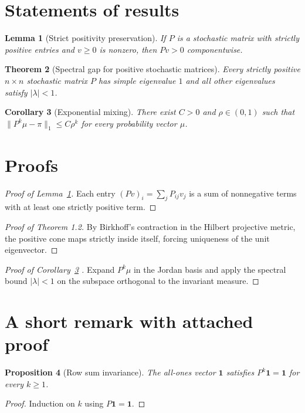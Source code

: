 \documentclass{article}
\newtheorem{theorem}{Theorem}[section]
\newtheorem{lemma}[theorem]{Lemma}
\newtheorem{proposition}[theorem]{Proposition}
\newtheorem{corollary}[theorem]{Corollary}
\begin{document}
\section{Statements of results}\label{sec:statements}
\begin{lemma}[Strict positivity preservation]\label{lem:pos}
If $P$ is a stochastic matrix with strictly positive entries and $v\ge 0$ is nonzero, then $Pv > 0$ componentwise.
\end{lemma}
\begin{theorem}[Spectral gap for positive stochastic matrices]\label{thm:gap}
Every strictly positive $n\times n$ stochastic matrix $P$ has simple eigenvalue $1$ and all other eigenvalues satisfy $|\lambda| < 1$.
\end{theorem}
\begin{corollary}[Exponential mixing]\label{cor:mix}
There exist $C>0$ and $\rho\in(0,1)$ such that $\|P^k \mu - \pi\|_1 \le C \rho^k$ for every probability vector $\mu$.
\end{corollary}
\section{Proofs}\label{sec:proofs}
\begin{proof}[Proof of Lemma~\ref{lem:pos}]
Each entry $(Pv)_i = \sum_j P_{ij} v_j$ is a sum of nonnegative terms with at least one strictly positive term.
\end{proof}
\begin{proof}[Proof of Theorem 1.2]
By Birkhoff's contraction in the Hilbert projective metric, the positive cone maps strictly inside itself, forcing uniqueness of the unit eigenvector.
\end{proof}
\begin{proof}[Proof of Corollary~\ref{cor:mix} \cite{seneta2006}]
Expand $P^k \mu$ in the Jordan basis and apply the spectral bound $|\lambda| < 1$ on the subspace orthogonal to the invariant measure.
\end{proof}
\section{A short remark with attached proof}\label{sec:attached}
\begin{proposition}[Row sum invariance]\label{prop:rowsum}
The all-ones vector $\mathbf{1}$ satisfies $P^k \mathbf{1} = \mathbf{1}$ for every $k\ge 1$.
\end{proposition}
\begin{proof}
Induction on $k$ using $P\mathbf{1}=\mathbf{1}$.
\end{proof}
\end{document}
